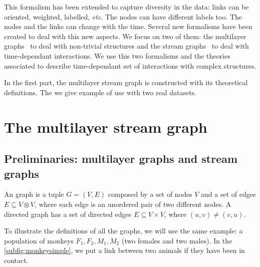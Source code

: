 \documentclass{svproc}
\begin{document}
This formalism has been extended to capture diversity in the data: links can be oriented, weighted, labelled, \textit{etc}. The nodes can have different labels too. The nodes and the links can change with the time. Several new formalisms have been created to deal with this new aspects. We focus on two of them: the multilayer graphs~\cite{mlkiv} to deal with non-trivial structures and the stream graphs~\cite{stream} to deal with time-dependant interactions. We use this two formalisms and the theories associated to describe time-dependant set of interactions with complex structures.

In the first part, the multilayer stream graph is constructed with its theoretical definitions. The we give example of use with two real datasets.


\section{The multilayer stream graph}
%


\subsection{Preliminaries: multilayer graphs and stream graphs}
%
An graph is a tuple $G=(V,E)$ composed by a set of nodes $V$ and a set of edges $E\subseteq V \otimes V$, where each edge is an unordered pair of two different nodes. A directed graph has a set of directed edges $E\subseteq V\times V$, where $(u,v) \neq (v,u)$.

To illustrate the definitions of all the graphs, we will use the same example: a population of monkeys $F_1, F_2, M_1, M_2$ (two females and two males). In the \cref{subfig:monkeysimple}, we put a link between two animals if they have been in contact.
\end{document}
